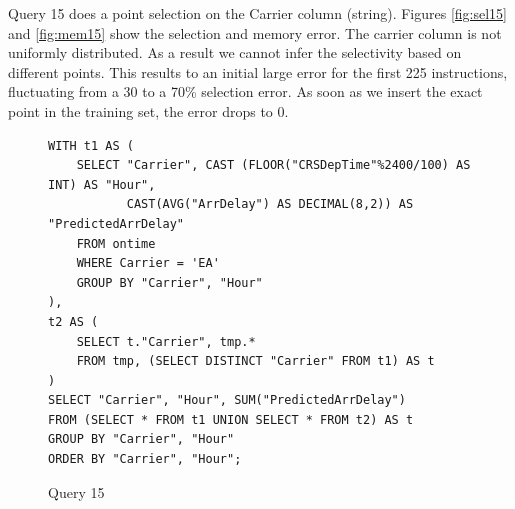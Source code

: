 Query 15 does a point selection on the Carrier column (string).
Figures \ref{fig:sel15} and \ref{fig:mem15} show the selection and memory error.
The carrier column is not uniformly distributed. As a result we cannot infer the
selectivity based on different points. This results to an initial large error
for the first 225 instructions, fluctuating from a 30 to a 70\% selection error.
As soon as we insert the exact point in the training set, the error drops to 0.

\begin{figure}[htb!]
\begin{lstlisting}[frame=single]
WITH t1 AS (
    SELECT "Carrier", CAST (FLOOR("CRSDepTime"%2400/100) AS INT) AS "Hour",
           CAST(AVG("ArrDelay") AS DECIMAL(8,2)) AS "PredictedArrDelay"
    FROM ontime
    WHERE Carrier = 'EA'
    GROUP BY "Carrier", "Hour"
),
t2 AS (
    SELECT t."Carrier", tmp.*
    FROM tmp, (SELECT DISTINCT "Carrier" FROM t1) AS t
)
SELECT "Carrier", "Hour", SUM("PredictedArrDelay")
FROM (SELECT * FROM t1 UNION SELECT * FROM t2) AS t
GROUP BY "Carrier", "Hour"
ORDER BY "Carrier", "Hour";
\end{lstlisting}
  \caption{Query 15}
  \label{sel:sql15}
\end{figure}


